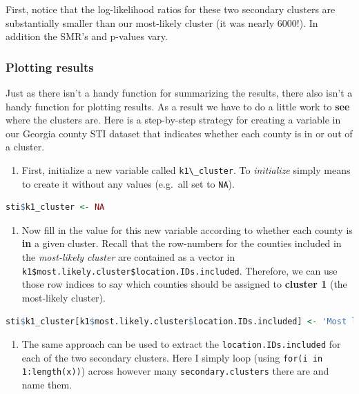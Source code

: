 \documentclass[
]{book}
\newcommand{\passthrough}[1]{#1}
\providecommand{\tightlist}{%
  \setlength{\itemsep}{0pt}\setlength{\parskip}{0pt}}
\begin{document}
First, notice that the log-likelihood ratios for these two secondary clusters are substantially smaller than our most-likely cluster (it was nearly 6000!). In addition the SMR's and p-values vary.

\hypertarget{plotting-results}{%
\subsubsection{Plotting results}\label{plotting-results}}

Just as there isn't a handy function for summarizing the results, there also isn't a handy function for plotting results. As a result we have to do a little work to \textbf{see} where the clusters are. Here is a step-by-step strategy for creating a variable in our Georgia county STI dataset that indicates whether each county is in or out of a cluster.

\begin{enumerate}
\def\labelenumi{\arabic{enumi}.}
\tightlist
\item
  First, initialize a new variable called \passthrough{\lstinline!k1\_cluster!}. To \emph{initialize} simply means to create it without any values (e.g.~all set to \passthrough{\lstinline!NA!}).
\end{enumerate}

\begin{lstlisting}[language=R]
sti$k1_cluster <- NA
\end{lstlisting}

\begin{enumerate}
\def\labelenumi{\arabic{enumi}.}
\setcounter{enumi}{1}
\tightlist
\item
  Now fill in the value for this new variable according to whether each county is \textbf{in} a given cluster. Recall that the row-numbers for the counties included in the \emph{most-likely cluster} are contained as a vector in \passthrough{\lstinline!k1$most.likely.cluster$location.IDs.included!}. Therefore, we can use those row indices to say which counties should be assigned to \textbf{cluster 1} (the most-likely cluster).
\end{enumerate}

\begin{lstlisting}[language=R]
sti$k1_cluster[k1$most.likely.cluster$location.IDs.included] <- 'Most likely cluster'
\end{lstlisting}

\begin{enumerate}
\def\labelenumi{\arabic{enumi}.}
\setcounter{enumi}{2}
\tightlist
\item
  The same approach can be used to extract the \passthrough{\lstinline!location.IDs.included!} for each of the two secondary clusters. Here I simply loop (using \passthrough{\lstinline!for(i in 1:length(x))!}) across however many \passthrough{\lstinline!secondary.clusters!} there are and name them.
\end{enumerate}
\end{document}
